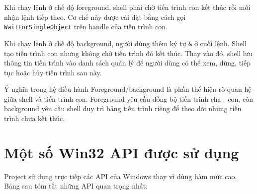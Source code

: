 \documentclass[13pt,a4paper,oneside]{extreport}
\begin{document}
Khi chạy lệnh ở chế độ foreground, shell phải chờ tiến trình con kết thúc rồi mới nhận lệnh tiếp theo. Cơ chế này được cài đặt bằng cách gọi \texttt{WaitForSingleObject} trên handle của tiến trình con.

Khi chạy lệnh ở chế độ background, người dùng thêm ký tự \texttt{\&} ở cuối lệnh. Shell tạo tiến trình con nhưng không chờ tiến trình đó kết thúc. Thay vào đó, shell lưu thông tin tiến trình vào danh sách quản lý để người dùng có thể xem, dừng, tiếp tục hoặc hủy tiến trình sau này.

\begin{noteBox}{Ý nghĩa trong hệ điều hành}
	Foreground/background là phần thể hiện rõ quan hệ giữa shell và tiến trình con. Foreground yêu cầu đồng bộ tiến trình cha - con, còn background yêu cầu shell duy trì bảng tiến trình riêng để theo dõi những tiến trình chưa kết thúc.
\end{noteBox}

\section{Một số Win32 API được sử dụng}

Project sử dụng trực tiếp các API của Windows thay vì dùng hàm mức cao. Bảng sau tóm tắt những API quan trọng nhất:
\end{document}
